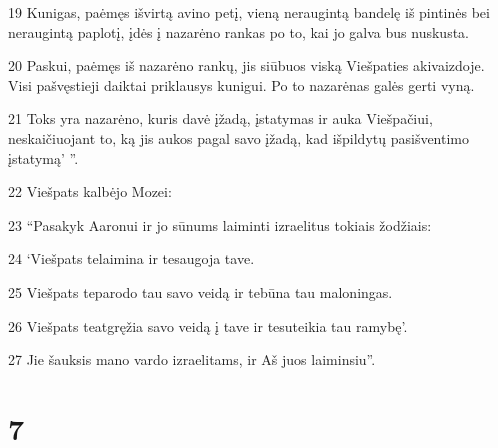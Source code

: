 \par 19 Kunigas, paėmęs išvirtą avino petį, vieną neraugintą bandelę iš pintinės bei neraugintą paplotį, įdės į nazarėno rankas po to, kai jo galva bus nuskusta. 
\par 20 Paskui, paėmęs iš nazarėno rankų, jis siūbuos viską Viešpaties akivaizdoje. Visi pašvęstieji daiktai priklausys kunigui. Po to nazarėnas galės gerti vyną. 
\par 21 Toks yra nazarėno, kuris davė įžadą, įstatymas ir auka Viešpačiui, neskaičiuojant to, ką jis aukos pagal savo įžadą, kad išpildytų pasišventimo įstatymą’ ”. 
\par 22 Viešpats kalbėjo Mozei: 
\par 23 “Pasakyk Aaronui ir jo sūnums laiminti izraelitus tokiais žodžiais: 
\par 24 ‘Viešpats telaimina ir tesaugoja tave. 
\par 25 Viešpats teparodo tau savo veidą ir tebūna tau maloningas. 
\par 26 Viešpats teatgręžia savo veidą į tave ir tesuteikia tau ramybę’. 
\par 27 Jie šauksis mano vardo izraelitams, ir Aš juos laiminsiu”.



\chapter{7}


